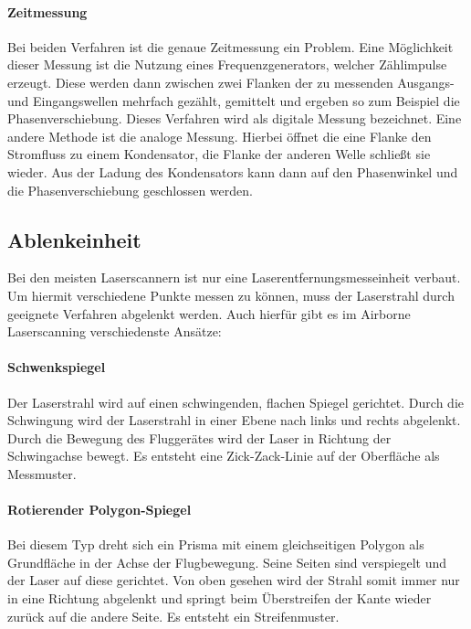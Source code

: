 \documentclass[a4paper,12pt,bibliography=totoc, listof=totoc,titlepage,pointlessnumbers]{scrreprt}
\begin{document}
\paragraph{Zeitmessung}
Bei beiden Verfahren ist die genaue Zeitmessung ein Problem. Eine Mög\-lich\-keit dieser Messung ist die Nutzung eines Frequenzgenerators, welcher Zähl\-imp\-ulse erzeugt. Diese werden dann zwischen zwei Flanken der zu messenden Ausgangs- und Eingangswellen mehrfach gezählt, gemittelt und ergeben so zum Beispiel die Phasenverschiebung. Dieses Verfahren wird als digitale Messung bezeichnet. Eine andere Methode ist die analoge Messung. Hierbei öffnet die eine Flanke den Stromfluss zu einem Kondensator, die Flanke der anderen Welle schließt sie wieder. Aus der Ladung des Kondensators kann dann auf den Phasenwinkel und die Phasenverschiebung geschlossen werden.  \citep[S. 314f]{Witte2006}

\subsection{Ablenkeinheit}
Bei den meisten Laser\-scan\-nern ist nur eine Laserentfernungsmesseinheit verbaut. Um hiermit verschiedene Punkte messen zu können, muss der Laserstrahl durch geeignete Verfahren abgelenkt werden. Auch hierfür gibt es im Air\-borne Laser\-scan\-ning verschiedenste Ansätze:

\paragraph{Schwenkspiegel}
Der Laserstrahl wird auf einen schwingenden, flachen Spiegel gerichtet. Durch die Schwingung wird der Laserstrahl in einer Ebene nach links und rechts abgelenkt. Durch die Bewegung des Fluggerätes wird der Laser in Richtung der Schwingachse bewegt. Es entsteht eine Zick-Zack-Linie auf der Oberfläche als Messmuster.

\paragraph{Rotierender Polygon-Spiegel}
Bei diesem Typ dreht sich ein Prisma mit einem gleichseitigen Polygon als Grundfläche in der Achse der Flugbewegung. Seine  Seiten sind verspiegelt und der Laser auf diese gerichtet. Von oben gesehen wird der Strahl somit immer nur in eine Richtung abgelenkt und springt beim Überstreifen der Kante  wieder zurück auf die andere Seite. Es entsteht ein Streifenmuster.
\end{document}
